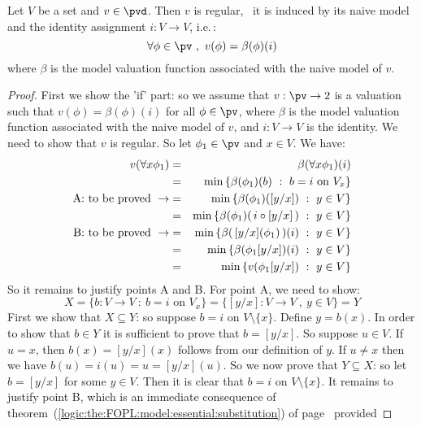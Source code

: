 \begin{theorem}\label{logic:the:FOPL:regval:regular:naive}
Let $V$ be a set and $v\in\pvd$. Then $v$ is regular, \ifand\ it is
induced by its naive model and the identity assignment $i:V\to V$,
i.e.\,:
    \[
    \forall \phi\in\pv\ ,\ v(\phi)=\beta(\phi)(i)
    \]
where $\beta$ is the model valuation function associated with the
naive model of $v$.
\end{theorem}
\begin{proof}
First we show the 'if' part: so we assume that $v:\pv\to 2$ is a
valuation such that $v(\phi)=\beta(\phi)(i)$ for all $\phi\in\pv$,
where $\beta$ is the model valuation function associated with the
naive model of $v$, and $i:V\to V$ is the identity. We need to show
that $v$ is regular. So let $\phi_{1}\in\pv$ and $x\in V$. We have:
    \begin{eqnarray*}
    v(\forall x\phi_{1})&=&\beta(\forall x\phi_{1})(i)\\
    &=&\min\left\{\beta(\phi_{1})(b)\ :\ b=i\mbox{\ on\
    }V_{x}\right\}\\
    \mbox{A: to be proved}\ \rightarrow
    &=&\min\left\{\beta(\phi_{1})([y/x])\ :\ y\in V\right\}\\
    &=&\min\left\{\beta(\phi_{1})(\,i\circ[y/x]\,)\ :\ y\in V\right\}\\
    \mbox{B: to be proved}\ \rightarrow
    &=&\min\left\{\beta(\,[y/x](\phi_{1})\,)(i)\ :\ y\in V\right\}\\
    &=&\min\left\{\beta(\phi_{1}[y/x])(i)\ :\ y\in V\right\}\\
    &=&\min\left\{v(\phi_{1}[y/x])\ :\ y\in V\right\}\\
    \end{eqnarray*}
So it remains to justify points A and B. For point A, we need to
show:
    \[
    X=\{b:V\to V\ :\ b=i\mbox{\ on\ }V_{x}\}=\{[y/x]:V\to V\ ,\ y\in
    V\}=Y
    \]
First we show that $X\subseteq Y$: so suppose $b=i$ on
$V\setminus\{x\}$. Define $y=b(x)$. In order to show that $b\in Y$
it is sufficient to prove that $b=[y/x]$. So suppose $u\in V$. If
$u=x$, then $b(x)=[y/x](x)$ follows from our definition of $y$. If
$u\neq x$ then we have $b(u)=i(u)=u=[y/x](u)$. So we now prove that
$Y\subseteq X$: so let $b=[y/x]$ for some $y\in V$. Then it is clear
that $b=i$ on $V\setminus\{x\}$. It remains to justify point B,
which is an immediate consequence of
theorem~(\ref{logic:the:FOPL:model:essential:substitution}) of
page~\pageref{logic:the:FOPL:model:essential:substitution} provided

\end{proof}
